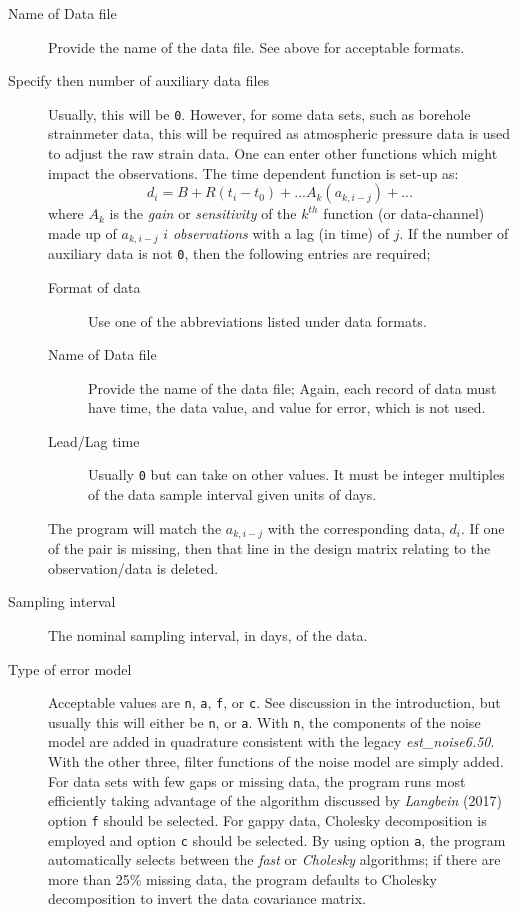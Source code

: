 \documentclass[12pt]{amsart}
\begin{document}
\begin{description}
\item[Name of Data file] Provide the name of the data file. See above for acceptable formats.

\item[Specify then number of auxiliary data files] Usually, this will be \texttt{0}.  However, for some data sets,
such as borehole strainmeter data, this will be required as atmospheric pressure data
is used to adjust the raw strain data. One can enter other functions which might impact the observations.  The time
dependent function is set-up as:
\begin{equation}
d_i  = B + R (t_i - t_0) + ...  A_k (a_{k,i-j}) + ...
\end{equation}
where $A_k$ is the \textit{gain} or \textit{sensitivity} of the $k^{th}$ function (or data-channel) made up of $a_{k,i-j}$
$i$ \textit{observations} with a lag (in time) of $j$.  If the number of auxiliary data is not \texttt{0}, then the following entries
are required;
\begin{description}
\item[Format of data] Use one of the abbreviations listed under data formats.
\item[Name of Data file] Provide the name of the data file; Again, each record of data must have time,
the data value, and value for error, which is not used.
\item[Lead/Lag time] Usually \texttt{0} but can take on other values. It must be integer multiples
of the data sample interval given units of days.
\end{description}
The program will match the $a_{k,i-j}$ with the corresponding data, $d_i$. If one of the pair is missing, then
that line in the design matrix relating to the observation/data is deleted.

\item[Sampling interval] The nominal sampling interval, in days, of the data.

\item[Type of error model] Acceptable values are \texttt{n}, \texttt{a}, \texttt{f}, or \texttt{c}.  See discussion in
the introduction, but usually this will either be \texttt{n}, or \texttt{a}. With \texttt{n}, the components of the noise
model are added in quadrature consistent with the legacy \textit{est\_noise6.50}. With the other three, filter functions of the noise model are simply added.  For data sets with few gaps or missing data, the program runs most efficiently
taking advantage of the algorithm discussed by \textit{Langbein} (2017) option \texttt{f} should be selected.
For gappy data, Cholesky decomposition is employed and option \texttt{c} should be selected.  By using
option \texttt{a}, the program automatically selects between the \textit{fast} or \textit{Cholesky} algorithms;
if there are more than 25\% missing data, the program defaults to Cholesky decomposition to invert the data
covariance matrix.


\end{description}
\end{document}
